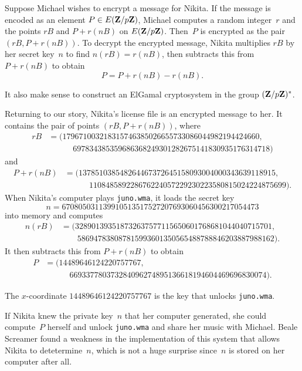 Suppose Michael wishes to encrypt a message for Nikita.
If the message is encoded as an element $P\in E(\mathbf{Z}/p\mathbf{Z}{})$,
Michael computes a random integer~$r$ and the
points $rB$ and $P+r(nB)$ on $E(\mathbf{Z}/p\mathbf{Z}{})$.
Then~$P$ is encrypted as the pair
$(rB, P+r(nB))$. To decrypt the encrypted message,
Nikita multiplies $rB$ by her secret key~$n$
to find $n(rB) = r(nB)$, then subtracts this from
$P+r(nB)$ to obtain
  $$P = P+r(nB)-r(nB).$$

\begin{remark}
  It also make sense to construct an ElGamal cryptosystem in the group
  $(\mathbf{Z}/p\mathbf{Z}{})^*$.
\end{remark}

Returning to our story, Nikita's license file is an encrypted message
to her.  It contains the pair of points $(rB,P+r(nB))$, where
\begin{align*}
  rB &= (179671003218315746385026655733086044982194424660,\\
    & \qquad\quad  697834385359686368249301282675141830935176314718)
\end{align*}
and
\begin{align*}
  P+r(nB) &= (137851038548264467372645158093004000343639118915,\\
&\qquad\quad 110848589228676224057229230223580815024224875699).
\end{align*}
When Nikita's computer plays {\tt juno.wma}, it loads the secret key
$$
n = 670805031139910513517527207693060456300217054473
$$
into memory and computes
\begin{align*}
n(rB) &=
  (328901393518732637577115650601768681044040715701,\\
   & \qquad 586947838087815993601350565488788846203887988162).
\end{align*}
It then subtracts this from $P+r(nB)$ to obtain
\begin{align*}
  P &= (14489646124220757767, \\
    &  \quad\qquad 669337780373284096274895136618194604469696830074).
\end{align*}

\noindent{}The $x$-coordinate $14489646124220757767$ is the
key that unlocks {\tt juno.wma}.


If Nikita knew the private key~$n$ that her computer generated, she
could compute~$P$ herself and unlock {\tt juno.wma} and share her
music with Michael.  Beale Screamer found a weakness in the
implementation of this system that allows Nikita to detetermine~$n$,
which is not a huge surprise since~$n$ is stored on her computer after
all.

